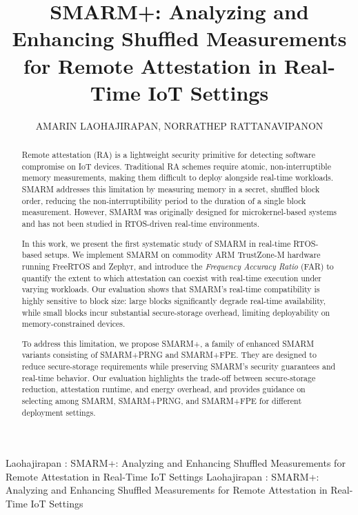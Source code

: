 \documentclass{ieeeaccess}
\begin{document}

\title{SMARM+: Analyzing and Enhancing Shuffled Measurements for Remote Attestation in Real-Time IoT Settings}\author{\uppercase{Amarin Laohajirapan},
\uppercase{Norrathep Rattanavipanon}}

\address[1]{College of Computing, Prince of Songkla University, Phuket Campus, Phuket, Thailand (e-mail: 6730621007@psu.ac.th)}

\address[2]{College of Computing, Prince of Songkla University, Phuket Campus, Phuket, Thailand (e-mail: norrathep.r@psu.ac.th)}

\markboth
{Laohajirapan \headeretal: SMARM+: Analyzing and Enhancing Shuffled Measurements for Remote Attestation in Real-Time IoT Settings}
{Laohajirapan \headeretal: SMARM+: Analyzing and Enhancing Shuffled Measurements for Remote Attestation in Real-Time IoT Settings}



\begin{abstract}
Remote attestation (RA) is a lightweight security primitive for detecting software compromise on IoT devices. Traditional RA schemes require atomic, non-interruptible memory measurements, making them difficult to deploy alongside real-time workloads. SMARM addresses this limitation by measuring memory in a secret, shuffled block order, reducing the non-interruptibility period to the duration of a single block measurement. However, SMARM was originally designed for microkernel-based systems and has not been studied in RTOS-driven real-time environments.


In this work, we present the first systematic study of SMARM in real-time RTOS-based setups. We implement SMARM on commodity ARM TrustZone-M hardware running FreeRTOS and Zephyr, and introduce the \emph{Frequency Accuracy Ratio} (FAR) to quantify the extent to which attestation can coexist with real-time execution under varying workloads. Our evaluation shows that SMARM’s real-time compatibility is highly sensitive to block size: large blocks significantly degrade real-time availability, while small blocks incur substantial secure-storage overhead, limiting deployability on memory-constrained devices.

To address this limitation, we propose SMARM+, a family of enhanced SMARM variants consisting of SMARM+PRNG and SMARM+FPE. They are designed to reduce secure-storage requirements while preserving SMARM’s security guarantees and real-time behavior. Our evaluation highlights the trade-off between secure-storage reduction, attestation runtime, and energy overhead, and provides guidance on selecting among SMARM, SMARM+PRNG, and SMARM+FPE for different deployment settings.

\end{abstract}
\end{document}
